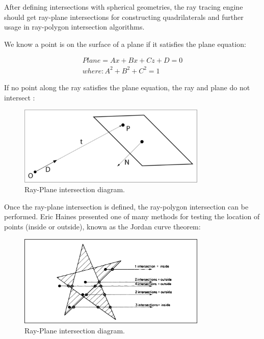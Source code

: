 \documentclass[12pt,a4paper,english]{article}
\begin{document}
After defining intersections with spherical geometries, the ray tracing engine should get ray-plane intersections for constructing quadrilaterals and further usage in ray-polygon intersection algorithms.

We know a point is on the surface of a plane if it satisfies the plane equation:

\begin{equation}
    \begin{split}
    Plane = Ax + Bx + Cz + D = 0 \\ where: A^2 + B^2 + C^2 = 1
    \end{split}
\end{equation}

If no point along the ray satisfies the plane equation, the ray and plane do not intersect \cite{Szauer_2017}:

\begin{figure}[H]
    \centering
    \includegraphics[width=0.8\textwidth]{ray-plane-intersection}
    \caption[]{Ray-Plane intersection diagram.}
    \label{fig:ray-plane-intersection}
\end{figure}

Once the ray-plane intersection is defined, the ray-polygon intersection can be performed. Eric Haines presented \cite{Haines_1989} one of many methods for testing the location of points (inside or outside), known as the Jordan curve theorem:

\begin{figure}[H]
    \centering
    \includegraphics[width=0.8\textwidth]{jordan-curve-haines}
    \caption[]{Ray-Plane intersection diagram.}
    \label{fig:jordan-curve-haines}
\end{figure}
\end{document}
